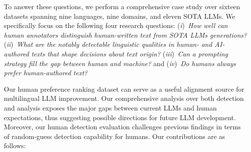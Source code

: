 To answer these questions, we perform a comprehensive case study over sixteen datasets spanning nine languages, nine domains, and eleven SOTA LLMs.
We specifically focus on the following four research questions: (\emph{i})~\emph{How well can human annotators distinguish human-written text from SOTA LLMs generations?} (\emph{ii})~\emph{What are the notably detectable linguistic qualities in human- and AI-authored texts that shape decisions about text origin?} (\emph{iii})~\emph{Can a prompting strategy fill the gap between human and machine?} and (\emph{iv})~\emph{Do humans always prefer human-authored text?}


Our human preference ranking dataset can serve as a useful alignment source for multilingual LLM improvement. Our comprehensive analysis over both detection and analysis exposes the major gaps between current LLMs and human expectations, thus suggesting possible directions for future LLM development. Moreover, our human detection evaluation challenges previous findings in terms of random-guess detection capability for humans.
% 
Our contributions are as follows:
